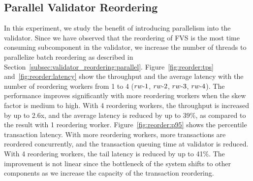 \subsection{Parallel Validator Reordering}
In this experiment, we study the benefit of introducing parallelism into the validator. Since we have observed that the reordering of FVS is the most time consuming subcomponent in the validator, we increase the number of threads to parallelize batch reordering as described in Section~\ref{subsec:validator_reordering:parallel}. 
Figure~\ref{fig:reorder:tps} and~\ref{fig:reorder:latency} show the throughput
and the average latency with the number of reordering workers from 1 to 4
($rw\hbox{-}1$, $rw\hbox{-}2$, $rw\hbox{-}3$, $rw\hbox{-}4$). The performance improves significantly with more reordering workers when the skew factor is medium to high. With 4 reordering workers, the throughput is increased by up to 2.6x, and the average latency is reduced by up to 39\%, as compared to the result with 1 reordering worker. Figure~\ref{fig:reorder:p95} shows the percentile transaction latency. With more reordering workers, more transactions are reordered concurrently, and the transaction queuing time at validator is reduced. With 4 reordering workers, the tail latency is reduced by up to 41\%. The improvement is not linear since the bottleneck of the system shifts to other
components as we increase the capacity of the transaction reordering.

